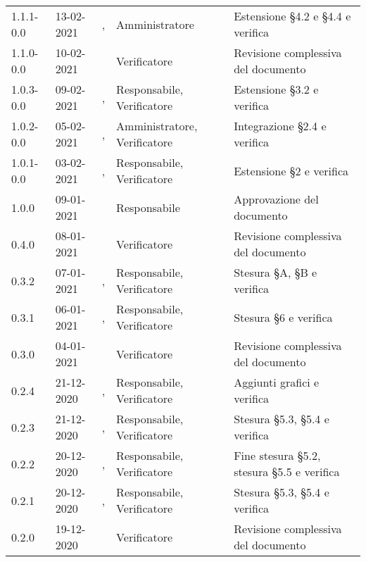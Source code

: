 {{\begin{longtable}{C{1.7cm} | C{2.2cm} | C{3.2cm} | C{3cm} | C{4.8cm}}
1.1.1-0.0 & 13-02-2021 & \SG{}, \ZM{} & Amministratore & Estensione \S 4.2 e \S 4.4 e verifica\\

1.1.0-0.0 & 10-02-2021 & \ZM{} & Verificatore & Revisione complessiva del documento\\

1.0.3-0.0 & 09-02-2021 & \PA{}, \SP{} & Responsabile, Verificatore & Estensione \S 3.2 e verifica\\

1.0.2-0.0 & 05-02-2021& \BM{}, \SP{} & Amministratore, Verificatore & Integrazione \S 2.4 e verifica\\

1.0.1-0.0 & 03-02-2021 & \PA{}, \SP{} & Responsabile, Verificatore & Estensione \S 2 e verifica\\

1.0.0 & 09-01-2021 & \SG{} & Responsabile & Approvazione del documento \\

0.4.0 & 08-01-2021 & \ZM{} & Verificatore & Revisione complessiva del documento \\

0.3.2 & 07-01-2021 & \BM{}, \ZM{} & Responsabile, Verificatore & Stesura \S A, \S B e verifica \\

0.3.1 & 06-01-2021 & \BM{}, \SH{} & Responsabile, Verificatore & Stesura \S 6 e verifica\\

0.3.0 & 04-01-2021 & \SH{} & Verificatore & Revisione complessiva del documento \\

0.2.4 & 21-12-2020 & \SG{}, \SH{} & Responsabile, Verificatore & Aggiunti grafici  e verifica\\

0.2.3 & 21-12-2020 & \BM{}, \ZM{} & Responsabile, Verificatore & Stesura \S 5.3, \S 5.4 e verifica\\

0.2.2 & 20-12-2020 & \SG{}, \ZM{} & Responsabile, Verificatore & Fine stesura \S 5.2, stesura \S 5.5  e verifica\\

0.2.1 & 20-12-2020 & \BM{}, \ZM{} & Responsabile, Verificatore & Stesura \S 5.3, \S 5.4 e verifica\\

0.2.0 & 19-12-2020 & \ZM{} & Verificatore & Revisione complessiva del documento \\


\end{longtable}}}
